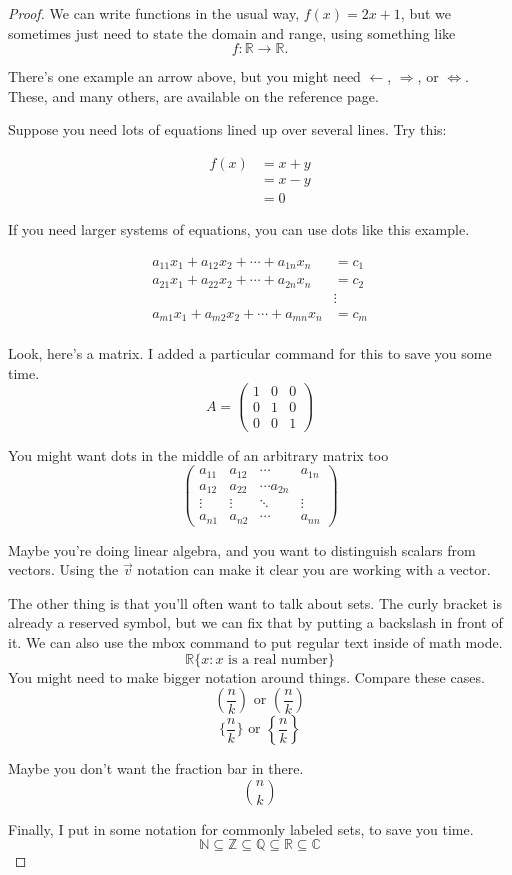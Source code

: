 \documentclass[12 pt]{article}
\theoremstyle{definition}
\newcommand{\C}{\mathbb{C}}
\newcommand{\R}{\mathbb{R}}
\newcommand{\N}{\mathbb{N}}
\newcommand{\Z}{\mathbb{Z}}
\newcommand{\Q}{\mathbb{Q}}
\newcommand\m[1]{\begin{pmatrix}#1\end{pmatrix}}
\begin{document}
\begin{proof}
We can write functions in the usual way, $f(x) = 2x +1$, but we sometimes just need to state the domain and range, using something like $$f: \R \rightarrow \R.$$

There's one example an arrow above, but you might need $\leftarrow$, $\Rightarrow$, or $\iff$. These, and many others, are available on the reference page.

Suppose you need lots of equations lined up over several lines. Try this:

\begin{align*}
f(x) &= x+y\\
&= x-y\\
&=0
\end{align*}

If you need larger systems of equations, you can use dots like this example.

\begin{align*}
    a_{11}x_1 + a_{12}x_2 + \cdots + a_{1n}x_n &= c_1\\
    a_{21}x_1 + a_{22}x_2 + \cdots + a_{2n}x_n &= c_2\\
    &\vdots\\
    a_{m1}x_1 + a_{m2}x_2 + \cdots + a_{mn}x_n &= c_m\\
\end{align*}


Look, here's a matrix. I added a particular command for this to save you some time.
$$A = \m{1&0&0\\0&1&0\\0&0&1}$$

You might want dots in the middle of an arbitrary matrix too
$$\m{a_{11}&a_{12}&\cdots& a_{1n}\\
a_{12}&a_{22}&\cdots a_{2n}\\
\vdots&\vdots&\ddots&\vdots\\
a_{n1}&a_{n2}&\cdots& a_{nn}}$$

Maybe you're doing linear algebra, and you want to distinguish scalars from vectors. Using the $\vec{v}$ notation can make it clear you are working with a vector.

The other thing is that you'll often want to talk about sets. The curly bracket is already a reserved symbol, but we can fix that by putting a backslash in front of it. We can also use the mbox command to put regular text inside of math mode.
$$\R \{x:x \mbox{ is a real number}\}$$
You might need to make bigger notation around things. Compare these cases.
$$(\frac{n}{k})\mbox{ or }\left(\frac{n}{k}\right)$$
$$\{\frac{n}{k}\}\mbox{ or }\left\{\frac{n}{k}\right\}$$

Maybe you don't want the fraction bar in there. 
$${n \choose k}$$

Finally, I put in some notation for commonly labeled sets, to save you time.
$$\N \subseteq \Z \subseteq \Q \subseteq \R \subseteq \C$$

\end{proof}

 
\end{document}
